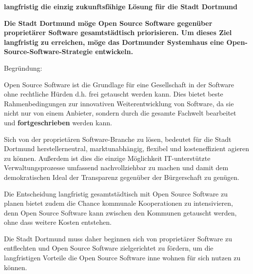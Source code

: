 \documentclass[a4paper]{article}
\newcommand\textstyleStrongEmphasis[1]{\textbf{#1}}
\begin{document}
{\bfseries
langfristig die einzig zukunftsf\"ahige L\"osung f\"ur die Stadt
Dortmund}


\bigskip


\bigskip

{\bfseries
Die Stadt Dortmund m\"oge Open Source Software gegen\"uber
propriet\"arer Software gesamtst\"adtisch priorisieren. Um dieses Ziel
langfristig zu erreichen, m\"oge das Dortmunder Systemhaus eine
Open-Source-Software-Strategie entwickeln.}


\bigskip

{
Begr\"undung:}

{
Open Source Software ist die Grundlage f\"ur eine Gesellschaft in der
Software ohne rechtliche H\"urden d.h. frei getauscht werden kann. Dies
bietet beste Rahmenbedingungen zur innovativen Weiterentwicklung von
Software, da sie nicht nur von einem Anbieter, sondern durch die
gesamte Fachwelt bearbeitet und
\textstyleStrongEmphasis{\textmd{fortgeschrieben}} werden kann.}

{
Sich von der propriet\"aren Software-Branche zu l\"osen, bedeutet f\"ur
die Stadt Dortmund herstellerneutral, marktunabh\"angig, flexibel und
kosteneffizient agieren zu k\"onnen. Au{\ss}erdem ist dies die einzige
M\"oglichkeit IT-unterst\"utzte Verwaltungsprozesse umfassend
nachvollziehbar zu machen und damit dem demokratischen Ideal der
Transparenz gegen\"uber der B\"urgerschaft zu gen\"ugen.}

{
Die Entscheidung langfristig gesamtst\"adtisch mit Open Source Software
zu planen bietet zudem die Chance kommunale Kooperationen zu
intensivieren, denn Open Source Software kann zwischen den Kommunen
getauscht werden, ohne dass weitere Kosten entstehen.}

{
Die Stadt Dortmund muss daher beginnen sich von propriet\"arer Software
zu entflechten und Open Source Software zielgerichtet zu f\"ordern, um
die langfristigen Vorteile die Open Source Software inne wohnen f\"ur
sich nutzen zu k\"onnen.}

\end{document}
